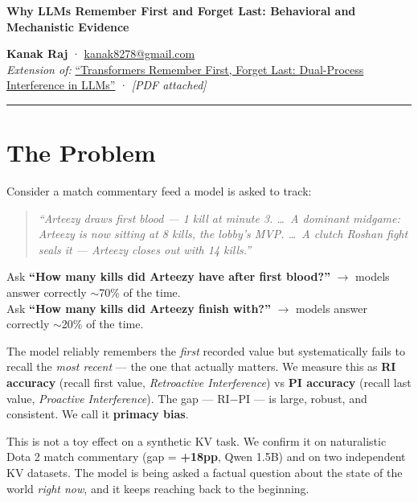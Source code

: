 \documentclass[9pt, a4paper]{article}
\begin{document}

{\large\bfseries Why LLMs Remember First and Forget Last: Behavioral and Mechanistic Evidence}

\vspace{4pt}
\textbf{Kanak Raj} · \href{mailto:kanak8278@gmail.com}{kanak8278@gmail.com}\\
{\small \textit{Extension of:} \href{https://arxiv.org/abs/2603.00270}{``Transformers Remember First, Forget Last: Dual-Process Interference in LLMs''} · \textit{[PDF attached]}}

\vspace{2pt}\rule{\linewidth}{0.5pt}

\section*{The Problem}

Consider a match commentary feed a model is asked to track:

\begin{quote}\small
\textit{``Arteezy draws first blood — 1 kill at minute 3. \ldots\ A dominant midgame: Arteezy is now sitting at 8 kills, the lobby's MVP. \ldots\ A clutch Roshan fight seals it — Arteezy closes out with 14 kills.''}
\end{quote}

Ask \textbf{``How many kills did Arteezy have after first blood?''} $\rightarrow$ models answer correctly $\sim$70\% of the time.\\
Ask \textbf{``How many kills did Arteezy finish with?''} $\rightarrow$ models answer correctly $\sim$20\% of the time.

The model reliably remembers the \textit{first} recorded value but systematically fails to recall the \textit{most recent} — the one that actually matters. We measure this as \textbf{RI accuracy} (recall first value, \textit{Retroactive Interference}) vs \textbf{PI accuracy} (recall last value, \textit{Proactive Interference}). The gap — RI$-$PI — is large, robust, and consistent. We call it \textbf{primacy bias}.

This is not a toy effect on a synthetic KV task. We confirm it on naturalistic Dota 2 match commentary (gap = \textbf{+18pp}, Qwen 1.5B) and on two independent KV datasets. The model is being asked a factual question about the state of the world \textit{right now}, and it keeps reaching back to the beginning.
\end{document}
